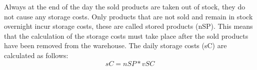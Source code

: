 Always at the end of the day the sold products are taken out of stock, they do not cause any storage costs. Only products that are not sold and remain in stock overnight incur storage costs, these are called stored products (\gls{nSP}). This means that the calculation of the storage costs must take place after the sold products have been removed from the warehouse. The daily storage costs (\gls{sC}) are calculated as follows:
\begin{equation}
\label{func:SC} %
    sC = nSP * vSC
\end{equation}
